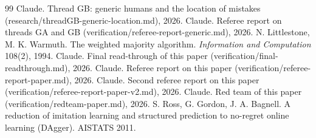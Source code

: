 \documentclass[11pt]{article}
\theoremstyle{definition}
\theoremstyle{remark}
\begin{document}
\begin{thebibliography}{99}
 Claude. Thread GB: generic humans and the location of mistakes (research/threadGB-generic-location.md), 2026.
 Claude. Referee report on threads GA and GB (verification/referee-report-generic.md), 2026.
 N. Littlestone, M. K. Warmuth. The weighted majority algorithm. \emph{Information and Computation} 108(2), 1994.
 Claude. Final read-through of this paper (verification/final-readthrough.md), 2026.
 Claude. Referee report on this paper (verification/referee-report-paper.md), 2026.
 Claude. Second referee report on this paper (verification/referee-report-paper-v2.md), 2026.
 Claude. Red team of this paper (verification/redteam-paper.md), 2026.
 S. Ross, G. Gordon, J. A. Bagnell. A reduction of imitation learning and structured prediction to no-regret online learning (DAgger). AISTATS 2011.
\end{thebibliography}
\end{document}
